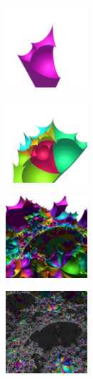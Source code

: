 \begin{figure}[h!tbp]
 \begin{minipage}[t]{0.19\textwidth}
  \centering
  \includegraphics[height=1.2in, keepaspectratio]{./img/application/sphairahedron/constructFractal/terrainProcess/step1.png}
  \label{fig:terrainStep1}
 \end{minipage}
 \hspace*{\fill}
 \begin{minipage}[t]{0.19\textwidth}
  \centering
  \includegraphics[height=1.2in, keepaspectratio]{./img/application/sphairahedron/constructFractal/terrainProcess/step2.png}
  \label{}
 \end{minipage}
 \hspace*{\fill}
 \begin{minipage}[t]{0.19\textwidth}
  \centering
  \includegraphics[height=1.2in, keepaspectratio]{./img/application/sphairahedron/constructFractal/terrainProcess/step5.png}
  \label{}
 \end{minipage}
 \hspace*{\fill}
 \begin{minipage}[t]{0.19\textwidth}
  \centering
  \includegraphics[height=1.2in, keepaspectratio]{./img/application/sphairahedron/constructFractal/terrainProcess/step10.jpg}

\end{minipage}
\end{figure}
